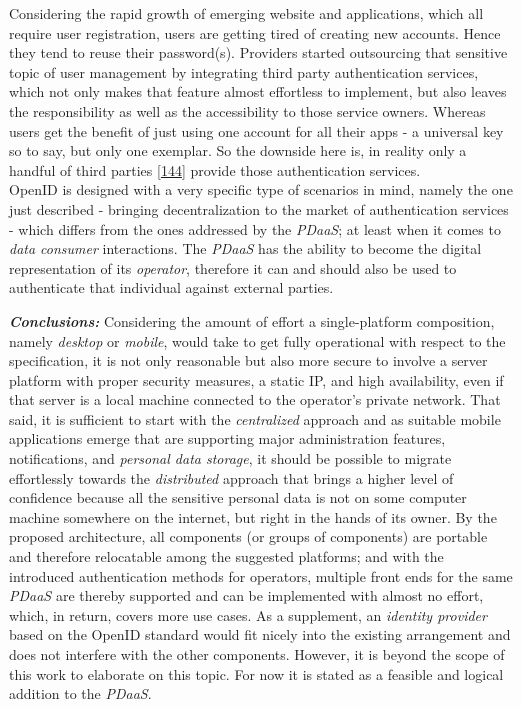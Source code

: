 \documentclass[12pt,english,a4paper,titlepage,cleardoublepage=empty,dottedtoc]{report}
\begin{document}
Considering the rapid growth of emerging website and applications, which
all require user registration, users are getting tired of creating new
accounts. Hence they tend to reuse their password(s). Providers started
outsourcing that sensitive topic of user management by integrating third
party authentication services, which not only makes that feature almost
effortless to implement, but also leaves the responsibility as well as
the accessibility to those service owners. Whereas users get the benefit
of just using one account for all their apps - a universal key so to
say, but only one exemplar. So the downside here is, in reality only a
handful of third parties
{[}\protect\hyperlink{ref-web_2009-success-of-facebook-connect}{144}{]}
provide those authentication services.\\
OpenID is designed with a very specific type of scenarios in mind,
namely the one just described - bringing decentralization to the market
of authentication services - which differs from the ones addressed by
the \emph{PDaaS}; at least when it comes to \emph{data consumer}
interactions. The \emph{PDaaS} has the ability to become the digital
representation of its \emph{operator}, therefore it can and should also
be used to authenticate that individual against external parties.

\emph{\textbf{Conclusions:}} Considering the amount of effort a
single-platform composition, namely \emph{desktop} or \emph{mobile},
would take to get fully operational with respect to the specification,
it is not only reasonable but also more secure to involve a server
platform with proper security measures, a static IP, and high
availability, even if that server is a local machine connected to the
operator's private network. That said, it is sufficient to start with
the \emph{centralized} approach and as suitable mobile applications
emerge that are supporting major administration features, notifications,
and \emph{personal data storage}, it should be possible to migrate
effortlessly towards the \emph{distributed} approach that brings a
higher level of confidence because all the sensitive personal data is
not on some computer machine somewhere on the internet, but right in the
hands of its owner. By the proposed architecture, all components (or
groups of components) are portable and therefore relocatable among the
suggested platforms; and with the introduced authentication methods for
operators, multiple front ends for the same \emph{PDaaS} are thereby
supported and can be implemented with almost no effort, which, in
return, covers more use cases. As a supplement, an \emph{identity
provider} based on the OpenID standard would fit nicely into the
existing arrangement and does not interfere with the other components.
However, it is beyond the scope of this work to elaborate on this topic.
For now it is stated as a feasible and logical addition to the
\emph{PDaaS}.
\end{document}
